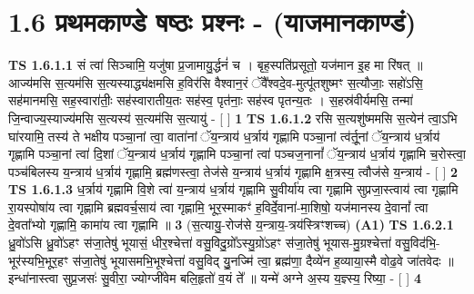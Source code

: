\documentclass[17pt]{extarticle}
\begin{document}
     \section*{ 1.6     प्रथमकाण्डे षष्ठः प्रश्नः - (याजमानकाण्डं) }
                                        \textbf{ TS 1.6.1.1} \newline
                  सं त्वा॑ सिञ्चामि॒ यजु॑षा प्र॒जामायु॒र्द्धनं॑ च । बृह॒स्पति॑प्रसूतो॒ यज॑मान इ॒ह मा रि॑षत् ॥ आज्य॑मसि स॒त्यम॑सि स॒त्यस्याद्ध्य॑क्षमसि ह॒विर॑सि वैश्वान॒रं ॅवै᳚श्वदे॒व-मुत्पू॑तशुष्मꣳ स॒त्यौजाः॒ सहो॑ऽसि॒ सह॑मानमसि॒ सह॒स्वारा॑तीः॒ सह॑स्वारातीय॒तः सह॑स्व॒ पृत॑नाः॒ सह॑स्व पृतन्य॒तः । स॒हस्र॑वीर्यमसि॒ तन्मा॑ जि॒न्वाज्य॒स्याज्य॑मसि स॒त्यस्य॑ स॒त्यम॑सि स॒त्यायु॑ - [ ] \textbf{  1} \newline
                  \newline
                                \textbf{ TS 1.6.1.2} \newline
                  रसि स॒त्यशु॑ष्ममसि स॒त्येन॑ त्वा॒ऽभि घा॑रयामि॒ तस्य॑ ते भक्षीय पञ्चा॒नां त्वा॒ वाता॑नां ॅय॒न्त्राय॑ ध॒र्त्राय॑ गृह्णामि पञ्चा॒नां त्व॑र्तू॒नां ॅय॒न्त्राय॑ ध॒र्त्राय॑ गृह्णामि पञ्चा॒नां त्वा॑ दि॒शां ॅय॒न्त्राय॑ ध॒र्त्राय॑ गृह्णामि पञ्चा॒नां त्वा॑ पञ्चज॒नानां᳚ ॅय॒न्त्राय॑ ध॒र्त्राय॑ गृह्णामि च॒रोस्त्वा॒ पञ्च॑बिलस्य य॒न्त्राय॑ ध॒र्त्राय॑ गृह्णामि॒ ब्रह्म॑णस्त्वा॒ तेज॑से य॒न्त्राय॑ ध॒र्त्राय॑ गृह्णामि क्ष॒त्रस्य॒ त्वौज॑से य॒न्त्राय॑ - [ ] \textbf{  2} \newline
                  \newline
                                \textbf{ TS 1.6.1.3} \newline
                  ध॒र्त्राय॑ गृह्णामि वि॒शे त्वा॑ य॒न्त्राय॑ ध॒र्त्राय॑ गृह्णामि सु॒वीर्या॑य त्वा गृह्णामि सुप्रजा॒स्त्वाय॑ त्वा गृह्णामि रा॒यस्पोषा॑य त्वा गृह्णामि ब्रह्मवर्च॒साय॑ त्वा गृह्णामि॒ भूर॒स्माकꣳ॑ ह॒विर्दे॒वाना॑-मा॒शिषो॒ यज॑मानस्य दे॒वानां᳚ त्वा दे॒वता᳚भ्यो गृह्णामि॒ कामा॑य त्वा गृह्णामि ॥ \textbf{  3} \newline
                  \newline
                      (स॒त्यायु॒-रोज॑से य॒न्त्राय॒-त्रय॑स्त्रिꣳशच्च)  \textbf{(A1)} \newline \newline
                                        \textbf{ TS 1.6.2.1} \newline
                  ध्रु॒वो॑ऽसि ध्रु॒वो॑ऽहꣳ स॑जा॒तेषु॑ भूयासं॒ धीर॒श्चेत्ता॑ वसु॒विदु॒ग्रो᳚ऽस्यु॒ग्रो॑ऽहꣳ स॑जा॒तेषु॑ भूयास-मु॒ग्रश्चेत्ता॑ वसु॒विद॑भि॒-भूर॑स्यभि॒भूर॒हꣳ स॑जा॒तेषु॑ भूयासमभि॒भूश्चेत्ता॑ वसु॒विद् यु॒॒नज्मि॑ त्वा॒ ब्रह्म॑णा॒ दैव्ये॑न ह॒व्याया॒स्मै वोढ॒वे जा॑तवेदः ॥ इन्धा॑नास्त्वा सुप्र॒जसः॑ सु॒वीरा॒ ज्योग्जी॑वेम बलि॒हृतो॑ व॒यं ते᳚ ॥ यन्मे॑ अग्ने अ॒स्य य॒ज्ञ्स्य॒ रिष्या॒ - [ ] \textbf{  4} \newline
\end{document}
